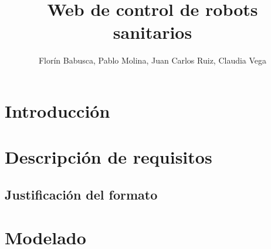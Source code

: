 \documentclass[12pt, a4paper]{exam}
\title{\textbf{Web de control de robots sanitarios}}
\author{Florín Babusca, Pablo Molina, Juan Carlos Ruiz, Claudia Vega}
\begin{document}

\begin{titlingpage}
\maketitle
\end{titlingpage}
\tableofcontents

\section{Introducción}

\section{Descripción de requisitos}
\label{sec:DocRequisitos}
    \subsection{Justificación del formato}
    


\section{Modelado}


\printbibliography
\newpage


\end{document}
